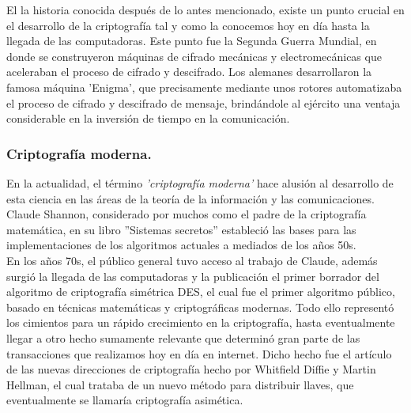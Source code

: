 \documentclass[12pt, a4paper, titlepage]{report}
\begin{document}
                El la historia conocida después de lo antes mencionado, existe un punto crucial en el desarrollo de la criptografía tal y como la conocemos hoy en día hasta la llegada de las computadoras. Este punto fue la Segunda Guerra Mundial, en donde se construyeron máquinas de cifrado mecánicas y electromecánicas que aceleraban el proceso de cifrado y descifrado. Los alemanes desarrollaron la famosa máquina 'Enigma', que precisamente mediante unos rotores automatizaba el proceso de cifrado y descifrado de mensaje, brindándole al ejército una ventaja considerable en la inversión de tiempo en la comunicación.
                
            \subsubsection{Criptografía moderna.}
                En la actualidad, el término \textit{'criptografía moderna'} hace alusión al desarrollo de esta ciencia en las áreas de la teoría de la información y las comunicaciones. Claude Shannon, considerado por muchos como el padre de la criptografía matemática, en su libro ''Sistemas secretos'' estableció las bases para las implementaciones de los algoritmos actuales a mediados de los años 50s. \cite{refCriptografia}\\
                En los años 70s, el público general tuvo acceso al trabajo de Claude, además surgió la llegada de las computadoras y la publicación el primer borrador del algoritmo de criptografía simétrica DES, el cual fue el primer algoritmo público, basado en técnicas matemáticas y criptográficas modernas. Todo ello representó los cimientos para un rápido crecimiento en la criptografía, hasta eventualmente llegar a otro hecho sumamente relevante que determinó gran parte de las transacciones que realizamos hoy en día en internet. Dicho hecho fue el artículo de las nuevas direcciones de criptografía hecho por Whitfield Diffie y Martin Hellman, el cual trataba de un nuevo método para distribuir llaves, que eventualmente se llamaría criptografía asimética.
                
\end{document}

